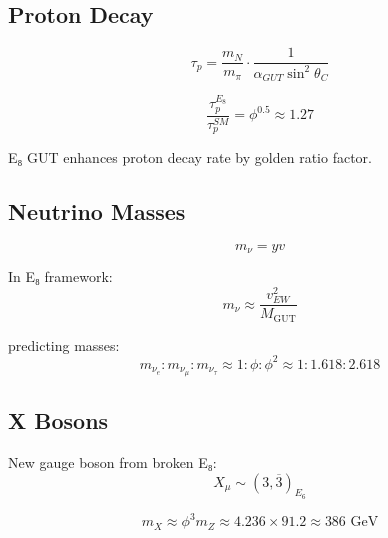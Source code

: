 \subsection{Proton Decay}

\begin{equation}
\tau_p = \frac{m_N}{m_\pi} \cdot \frac{1}{\alpha_{GUT} \sin^2\theta_C}
\end{equation}

\begin{proposition}[E₈ Enhancement]
\label{pro:e8-proton}
\begin{equation}
\frac{\tau_p^{E_8}}{\tau_p^{SM}} = \phi^{0.5} \approx 1.27
\end{equation}

E₈ GUT enhances proton decay rate by golden ratio factor.
\end{proposition}

\subsection{Neutrino Masses}

\begin{equation}
m_{\nu} = y v
\end{equation}

\begin{theorem}
\label{thm:seesaw}
In E₈ framework:
\begin{equation}
m_{\nu} \approx \frac{v_{EW}^2}{M_{\text{GUT}}}
\end{equation}

predicting masses:
\begin{equation}
m_{\nu_e}:m_{\nu_\mu}:m_{\nu_\tau} \approx 1:\phi:\phi^2 \approx 1:1.618:2.618
\end{equation}
\end{theorem}

\subsection{X Bosons}

\begin{definition}[X Boson]
\label{def:x-boson}
New gauge boson from broken E₈:
\begin{equation}
X_\mu \sim (3,\overline{3})_{E_6}
\end{equation}
\end{definition}

\begin{proposition}
\label{prop:x-mass}
\begin{equation}
m_X \approx \phi^3 m_{Z} \approx 4.236 \times 91.2 \approx 386 \text{ GeV}
\end{equation}
\end{proposition}

